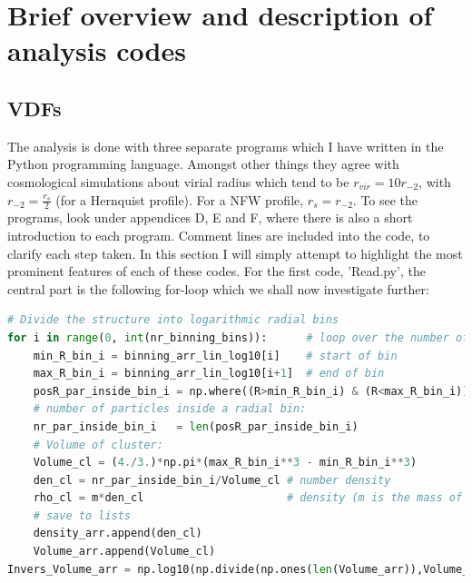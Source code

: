 \section{Brief overview and description of analysis codes}

\subsection{VDFs}
The analysis is done with three separate programs which I have written in the Python programming language. Amongst other things they agree with cosmological simulations about virial radius which tend to be $r_{vir}=10r_{-2}$, with $r_{-2} = \frac{r_s}{2}$ (for a Hernquist profile). For a NFW profile, $r_s=r_{-2}$. To see the programs, look under appendices D, E and F, where there is also a short introduction to each program. Comment lines are included into the code, to clarify each step taken. In this section I will simply attempt to highlight the most prominent features of each of these codes. For the first code, 'Read.py', the central part is the following for-loop which we shall now investigate further: \\ 

\begin{pythonstyle}
\begin{lstlisting}[language=Python]
# Divide the structure into logarithmic radial bins
for i in range(0, int(nr_binning_bins)):      # loop over the number of bins 
    min_R_bin_i = binning_arr_lin_log10[i]    # start of bin 
    max_R_bin_i = binning_arr_lin_log10[i+1]  # end of bin 
    posR_par_inside_bin_i = np.where((R>min_R_bin_i) & (R<max_R_bin_i))[0] # position of particles inside a radial bin 
    # number of particles inside a radial bin:    
    nr_par_inside_bin_i   = len(posR_par_inside_bin_i)                     
    # Volume of cluster: 
    Volume_cl = (4./3.)*np.pi*(max_R_bin_i**3 - min_R_bin_i**3) 
    den_cl = nr_par_inside_bin_i/Volume_cl # number density 
    rho_cl = m*den_cl                      # density (m is the mass of each particle, m = M/N = 1/N)
    # save to lists 
    density_arr.append(den_cl) 
    Volume_arr.append(Volume_cl) 
Invers_Volume_arr = np.log10(np.divide(np.ones(len(Volume_arr)),Volume_arr)) 
\end{lstlisting}
\end{pythonstyle}

